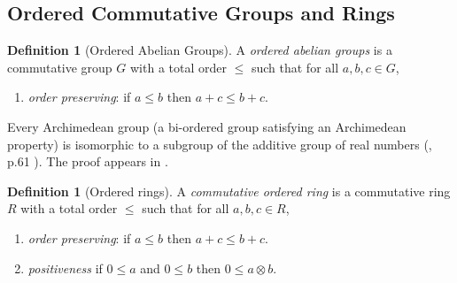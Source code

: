 \documentclass{article}
\theoremstyle{definition}
\newtheorem{definition}[theorem]{Definition}
\begin{document}
\subsection{Ordered Commutative Groups and Rings}


\begin{definition} [Ordered Abelian Groups]
A {\em ordered abelian groups} is a commutative group $G$
with a total order $\leq$  such that for all $a,b,c \in G$,
\begin{enumerate}
\item {\em order preserving}: if $a \leq b$ then $a + c \leq b + c$.
\end{enumerate}
\end{definition}

Every Archimedean group (a bi-ordered group satisfying an Archimedean property) 
is isomorphic to a subgroup of the additive group of real numbers (\cite{fuchs2001modules}, p.61 ).
The proof appears in  \cite{Fuchs1983}.

\begin{definition} [Ordered rings]
A {\em commutative ordered ring} is a commutative ring $R$
with a total order $\leq$  such that for all $a,b,c \in R$,
\begin{enumerate}
\item {\em order preserving}: if $a \leq b$ then $a + c \leq b + c$.
\item {\em positiveness} if $0 \leq a$ and $0 \leq b$ then $0 \leq a \otimes b$.
\end{enumerate}
\end{definition}
%

%
\end{document}
